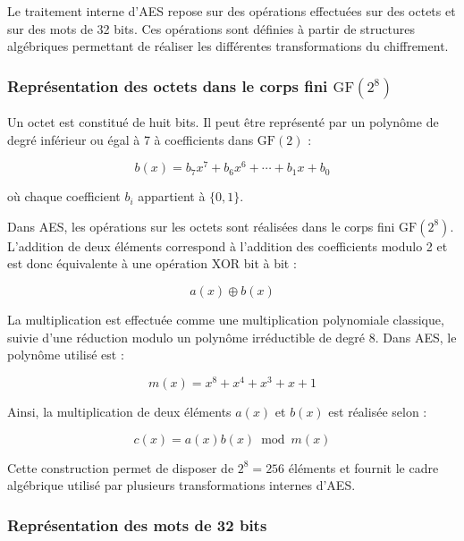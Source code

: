 \documentclass[12pt,a4paper]{article}
\begin{document}
Le traitement interne d'AES repose sur des opérations effectuées sur
des octets et sur des mots de 32 bits. Ces opérations sont définies
à partir de structures algébriques permettant de réaliser les
différentes transformations du chiffrement.

\subsubsection{Représentation des octets dans le corps fini
$\mathrm{GF}(2^8)$}

Un octet est constitué de huit bits. Il peut être représenté par un
polynôme de degré inférieur ou égal à 7 à coefficients dans
$\mathrm{GF}(2)$ :

\begin{equation}
b(x)=b_7x^7+b_6x^6+\cdots+b_1x+b_0
\end{equation}

où chaque coefficient $b_i$ appartient à $\{0,1\}$.

Dans AES, les opérations sur les octets sont réalisées dans le corps
fini $\mathrm{GF}(2^8)$. L'addition de deux éléments correspond à
l'addition des coefficients modulo 2 et est donc équivalente à une
opération XOR bit à bit :

\begin{equation}
a(x)\oplus b(x)
\end{equation}

La multiplication est effectuée comme une multiplication
polynomiale classique, suivie d'une réduction modulo un polynôme
irréductible de degré 8. Dans AES, le polynôme utilisé est :

\begin{equation}
m(x)=x^8+x^4+x^3+x+1
\end{equation}

Ainsi, la multiplication de deux éléments $a(x)$ et $b(x)$ est
réalisée selon :

\begin{equation}
c(x)=a(x)b(x)\bmod m(x)
\end{equation}

Cette construction permet de disposer de $2^8=256$ éléments et
fournit le cadre algébrique utilisé par plusieurs transformations
internes d'AES.

\subsubsection{Représentation des mots de 32 bits}
\end{document}
